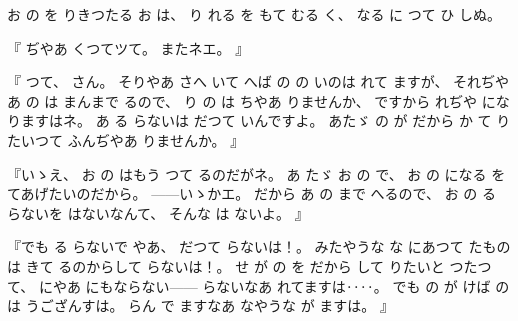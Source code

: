 %
お
の
を
りきつたる
お
は、
%
り
れる
を
もて
むる
く、
%
なる
に
つて
ひ
しぬ。

%
『
ぢやあ
くつてツて。
%
またネエ。
』

%
『
つて、
%
さん。
%
そりやあ
さへ
いて
へば
の
の
いのは
れて
ますが、
%
それぢやあ
の
は
まんまで
るので、
%
り
の
は
ちやあ%
りませんか、
%
ですから
れぢや
になりますはネ。
%
あ
る
らないは
だつて
いんですよ。
%
あたゞ
の
が
だから%
か
て
りたいつて
ふんぢやあ
りませんか。
』

%
『いゝえ、
%
お
の
はもう
つて
るのだがネ。
%
あ
たゞ
お
の
で、
%
お
の
になる
を
てあげたいのだから。
%
{---}{---}いゝかエ。
%
だから
あ
の
まで
へるので、
%
お
の
る
らないを
はないなんて、
%
そんな
は
ないよ。
』

%
『でも
る
らないで
やあ、
%
だつて
らないは！。
%
みたやうな
な
にあつて
たものは
きて
るのからして
らないは！。
%
せ
が
の
を
だから%
して
りたいと
つたつて、
%
にやあ
にもならない{---}{---}
らないなあ
れてますは‥‥。
%
でも
の
が
けば%
の
は
うござんすは。
%
らん
で
ますなあ
なやうな
が
ますは。
』

